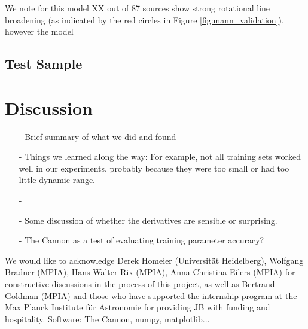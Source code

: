 \documentclass[modern]{aastex62}
\begin{document}
We note for this model XX out of 87 sources show strong rotational line broadening (as indicated by the red circles in Figure \ref{fig:mann_validation}), however the model 

\subsection{Test Sample}



\section{Discussion} \label{sec:discussion}

\begin{enumerate}
\item[-] Brief summary of what we did and found

\item[-] Things we learned along the way: For example, not all training sets worked well in our experiments, probably because they were too small or had too little dynamic range.

\item[-] \color{gcolor}{HOGG: Some discussion of precision and accuracy: The Cannon can produce precise results, but is only as accurate as its training set.}\color{black}

\item[-] Some discussion of whether the derivatives are sensible or surprising. \color{red}{Add derivative plots.}\color{black}

\item[-] The Cannon as a test of evaluating training parameter accuracy? 
\end{enumerate}

\acknowledgements
We would like to acknowledge Derek Homeier (Universit{\"a}t Heidelberg), Wolfgang Bradner (MPIA), Hans Walter Rix (MPIA), Anna-Christina Eilers (MPIA) for constructive discussions in the process of this project, as well as Bertrand Goldman (MPIA) and those who have supported the internship program at the Max Planck Institute f{\"u}r Astronomie for providing JB with funding and hospitality. \color{red}Software: The Cannon, numpy, matplotlib... \color{black}

\color{gcolor}{HOGG: SDSS acknowledgments... Grants and stuff...}\color{black}  
\end{document}
